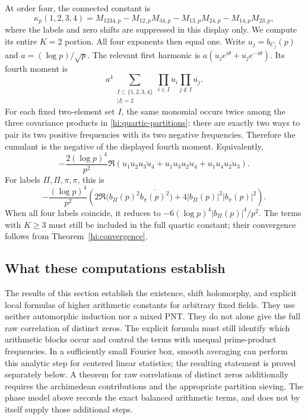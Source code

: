 \documentclass[11pt,reqno]{amsart}
\numberwithin{equation}{section}
\theoremstyle{definition}
\theoremstyle{remark}
\begin{document}
At order four, the connected constant is
\begin{equation}\label{hi:quartic-partitions}
 \kappa_p(1,2,3,4)=M_{1234,p}
 -M_{12,p}M_{34,p}-M_{13,p}M_{24,p}-M_{14,p}M_{23,p},
\end{equation}
where the labels and zero shifts are suppressed in this display only.
We compute its entire $K=2$ portion.  All four exponents then equal one.
Write $u_j=b_{C_j}(p)$ and $a=(\log p)/\sqrt p$.  The relevant first
harmonic is $a(u_je^{i\theta}+\overline{u_j}e^{-i\theta})$.
Its fourth moment is
\[
 a^4\sum_{\substack{I\subset\{1,2,3,4\}\\|I|=2}}
 \prod_{i\in I}u_i\prod_{j\notin I}\overline{u_j}.
\]
For each fixed two-element set $I$, the same monomial occurs twice among
the three covariance products in \eqref{hi:quartic-partitions}: there are
exactly two ways to pair its two positive frequencies with its two
negative frequencies.  Therefore the cumulant is the negative of the
displayed fourth moment.  Equivalently,
\begin{equation}\label{hi:quartic-first}
 -\frac{2(\log p)^4}{p^2}\Re\left(
 u_1u_2\overline{u_3u_4}
 +u_1u_3\overline{u_2u_4}
 +u_1u_4\overline{u_2u_3}\right).
\end{equation}
For labels $\Pi,\Pi,\pi,\pi$, this is
\begin{equation}\label{hi:quartic-mixed}
 -\frac{(\log p)^4}{p^2}
 \left(2\Re\bigl(b_\Pi(p)^2\overline{b_\pi(p)^2}\bigr)
       +4|b_\Pi(p)|^2|b_\pi(p)|^2\right).
\end{equation}
When all four labels coincide, it reduces to
$-6(\log p)^4|b_\Pi(p)|^4/p^2$.  The terms with $K\geq3$ must still be
included in the full quartic constant; their convergence follows from
Theorem~\ref{hi:convergence}.

\subsection{What these computations establish}

The results of this section establish the existence, shift holomorphy,
and explicit local formulas of higher arithmetic constants for arbitrary
fixed fields.  They use neither automorphic induction nor a mixed PNT.
They do not alone give the full raw correlation of distinct zeros.  The
explicit formula must still identify which arithmetic blocks occur and
control the terms with unequal prime-product frequencies.  In a sufficiently
small Fourier box, smooth averaging can perform this analytic step for
centered linear statistics; the resulting statement is proved separately
below.  A theorem for raw correlations of distinct zeros additionally
requires the archimedean contributions and the appropriate partition
sieving.  The phase model above records the exact balanced arithmetic
terms, and does not by itself supply those additional steps.
\end{document}
